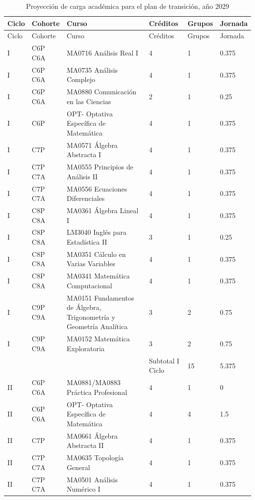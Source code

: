 \begin{longtable}[c]{|p{0.8cm}|p{1.8cm}|p{6.8cm}|p{1.5cm}|p{1.3cm}|p{1.5cm}|}
\caption{Proyección de carga académica para el plan de transición, año 2029}
\label{tab:carga2029}\\
\hline
\rowcolor[HTML]{00C0F3}
Ciclo & Cohorte & Curso & Créditos & Grupos & Jornada \\ \hline
\endfirsthead
\hline
\rowcolor[HTML]{00C0F3}
Ciclo & Cohorte & Curso & Créditos & Grupos & Jornada \\ \hline
\endhead
%
I & C6P C6A & MA0716 Análisis Real I & 4 & 1 & 0.375 \\ \hline
I & C6P C6A & MA0735 Análisis Complejo & 4 & 1 & 0.375 \\ \hline
I & C6P C6A & MA0880 Comunicación en las Ciencias & 2 & 1 & 0.25 \\ \hline
I & C6P & OPT- Optativa Específica de Matemática & 4 & 1 & 0.375 \\ \hline
I & C7P & MA0571 Álgebra Abstracta I & 4 & 1 & 0.375 \\ \hline
I & C7P C7A & MA0555 Principios de Análisis II & 4 & 1 & 0.375 \\ \hline
I & C7P C7A & MA0556 Ecuaciones Diferenciales & 4 & 1 & 0.375 \\ \hline
I & C8P C8A & MA0361 Álgebra Lineal I & 4 & 1 & 0.375 \\ \hline
I & C8P C8A & LM3040 Inglés para Estadística II & 3 & 1 & 0.25 \\ \hline
I & C8P C8A & MA0351 Cálculo en Varias Variables & 4 & 1 & 0.375 \\ \hline
I & C8P C8A & MA0341 Matemática Computacional & 4 & 1 & 0.375 \\ \hline
I & C9P C9A & MA0151 Fundamentos de Álgebra, Trigonometría y Geometría Analítica & 3 & 2 & 0.75 \\ \hline
I & C9P C9A & MA0152 Matemática Exploratoria & 3 & 2 & 0.75 \\ \hline
 &  &  & Subtotal I Ciclo & 15 & 5.375 \\ \hline
II & C6P C6A & MA0881/MA0883 Práctica Profesional & 4 & 1 & 0 \\ \hline
II & C6P C6A & OPT- Optativa Específica de Matemática & 4 & 4 & 1.5 \\ \hline
II & C7P & MA0661 Álgebra Abstracta II & 4 & 1 & 0.375 \\ \hline
II & C7P C7A & MA0635 Topología General & 4 & 1 & 0.375 \\ \hline
II & C7P C7A & MA0501 Análisis Numérico I & 4 & 1 & 0.375 \\ \hline

\end{longtable}
